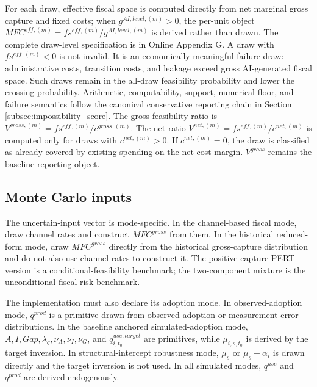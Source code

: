\documentclass[11pt,a4paper]{article}
\begin{document}
For each draw, effective fiscal space is computed directly from net marginal gross capture and fixed costs; when $g^{AI,level,(m)}>0$, the per-unit object $MFC^{eff,(m)}=fs^{eff,(m)}/g^{AI,level,(m)}$ is derived rather than drawn. The complete draw-level specification is in Online Appendix G.
A draw with $fs^{eff,(m)}<0$ is not invalid. It is an economically meaningful failure draw: administrative costs, transition costs, and leakage exceed gross AI-generated fiscal space. Such draws remain in the all-draw feasibility probability and lower the crossing probability.
Arithmetic, computability, support, numerical-floor, and failure semantics follow the canonical conservative reporting chain in Section \ref{subsec:impossibility_score}.
The gross feasibility ratio is $V^{gross,(m)}=fs^{eff,(m)}/c^{gross,(m)}$. The net ratio $V^{net,(m)}=fs^{eff,(m)}/c^{net,(m)}$ is computed only for draws with $c^{net,(m)}>0$.
If $c^{net,(m)}=0$, the draw is classified as already covered by existing spending on the net-cost margin. $V^{gross}$ remains the baseline reporting object.

\subsection{Monte Carlo inputs}

The uncertain-input vector is mode-specific. In the channel-based fiscal mode, draw channel rates and construct $MFC^{gross}$ from them. In the historical reduced-form mode, draw $MFC^{gross}$ directly from the historical gross-capture distribution and do not also use channel rates to construct it. The positive-capture PERT version is a conditional-feasibility benchmark; the two-component mixture is the unconditional fiscal-risk benchmark.

The implementation must also declare its adoption mode. In observed-adoption mode, $q^{prod}$ is a primitive drawn from observed adoption or measurement-error distributions. In the baseline anchored simulated-adoption mode, $A,I,Gap,\lambda_q,\nu_A,\nu_I,\nu_G$, and $q^{use,target}_{i,t_0}$ are primitives, while $\mu_{i,s,t_0}$ is derived by the target inversion. In structural-intercept robustness mode, $\mu_s$ or $\mu_s+\alpha_i$ is drawn directly and the target inversion is not used. In all simulated modes, $q^{use}$ and $q^{prod}$ are derived endogenously.
\end{document}

